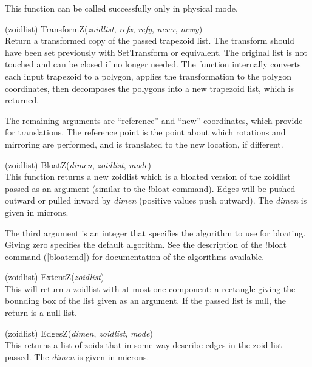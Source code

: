 \begin{description}
This function can be called successfully only in physical mode.

\item{(zoidlist) \vt TransformZ({\it zoidlist\/}, {\it refx\/},
  {\it refy\/}, {\it newx\/}, {\it newy\/})}\\
Return a transformed copy of the passed trapezoid list.  The transform
should have been set previously with {\vt SetTransform} or equivalent. 
The original list is not touched and can be closed if no longer
needed.  The function internally converts each input trapezoid to a
polygon, applies the transformation to the polygon coordinates, then
decomposes the polygons into a new trapezoid list, which is returned.
 
The remaining arguments are ``reference'' and ``new'' coordinates,
which provide for translations.  The reference point is the point
about which rotations and mirroring are performed, and is translated
to the new location, if different.

\item{(zoidlist) \vt BloatZ({\it dimen}, {\it zoidlist\/}, {\it mode\/})}\\
This function returns a new zoidlist which is a bloated version of the
zoidlist passed as an argument (similar to the {\cb !bloat} command). 
Edges will be pushed outward or pulled inward by {\it dimen} (positive
values push outward).  The {\it dimen} is given in microns.

The third argument is an integer that specifies the algorithm to use
for bloating.  Giving zero specifies the default algorithm.  See the
description of the {\cb !bloat} command (\ref{bloatcmd}) for
documentation of the algorithms available. 

\item{(zoidlist) \vt ExtentZ({\it zoidlist\/})}\\
This will return a zoidlist with at most one component:  a rectangle
giving the bounding box of the list given as an argument.  If the
passed list is null, the return is a null list.

\item{(zoidlist) \vt EdgesZ({\it dimen}, {\it zoidlist\/}, {\it mode\/})}\\
This returns a list of zoids that in some way describe edges in the
zoid list passed.  The {\it dimen} is given in microns.


\end{description}
